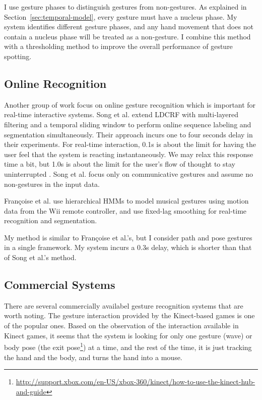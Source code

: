 I use gesture phases to distinguish gestures from non-gestures. As explained in
Section~\ref{sec:temporal-model}, every gesture must have a nucleus phase.
My system identifies different gesture phases, and any hand movement that does
not contain a nucleus phase will be treated as a non-gesture. I combine this
method with a thresholding method to improve the overall performance of gesture
spotting.

\subsection{Online Recognition}
Another group of work focus on online gesture recognition which is important
for real-time interactive systems. Song et al.
\cite{song12} extend LDCRF with multi-layered filtering and a temporal sliding window to perform online sequence labeling and
segmentation simultaneously.
Their approach incurs one to four seconds delay in their
experiments. For real-time interaction, 0.1s is about the limit for having the
user feel that the system is reacting instantaneously. We may relax this response time a
bit, but 1.0s is about the limit for the user's flow of thought to stay
uninterrupted \cite{card91}.  Song et al. focus only on communicative
gestures and assume no non-gestures in the input data. 

Fran{\c{c}}oise et al. \cite{francoise11} use hierarchical HMMs to model musical
gestures using motion data from the Wii remote controller, and use fixed-lag
smoothing for real-time recognition and segmentation.

My method is similar to Fran{\c{c}}oise et al.'s, but I consider path and pose
gestures in a single framework. My system incurs a 0.3s delay, which is shorter
than that of Song et al.'s method.

\subsection{Commercial Systems}
There are several commercially availabel gesture recognition systems that
are worth noting. 
The gesture interaction provided by the Kinect-based games is
one of the popular ones. Based on the observation of the interaction
available in Kinect games, it seems that the system is looking for only one
gesture (wave) or body pose (the exit
pose\footnote{\url{http://support.xbox.com/en-US/xbox-360/kinect/how-to-use-the-kinect-hub-and-guide}}) at a time, and the rest of the time, 
it is just tracking the hand and the body, and turns the hand into a mouse.

